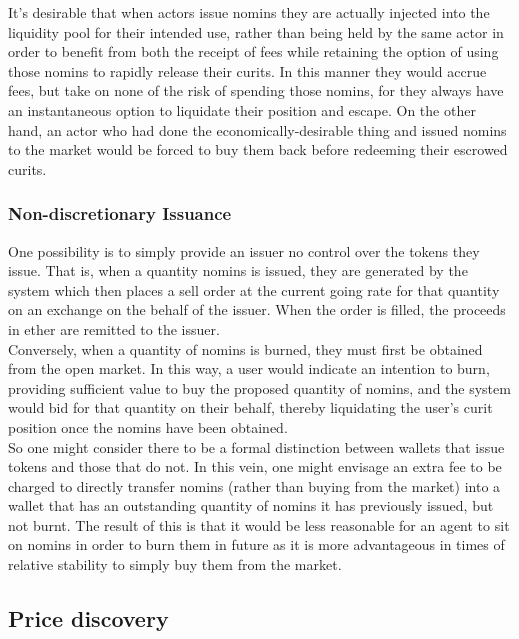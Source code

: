 \noindent It's desirable that when actors issue nomins they are actually injected into the liquidity pool for their intended use,
rather than being held by the same actor in order to benefit from both the receipt of fees while retaining the option of using those nomins to rapidly release their curits.
In this manner they would accrue fees, but take on none of the risk of spending those nomins, for they always have an instantaneous option to liquidate their position and escape.
On the other hand, an actor who had done the economically-desirable thing and issued nomins to the market would be forced to buy them back before redeeming their escrowed curits.

\subsubsection{Non-discretionary Issuance}

One possibility is to simply provide an issuer no control over the tokens they issue. That is, when a quantity nomins is issued, they are generated by the system which then places a sell order at the current going rate for that quantity on an exchange on the behalf of the issuer. When the order is filled, the proceeds in ether are remitted to the issuer. \\

\noindent Conversely, when a quantity of nomins is burned, they must first be obtained from the open market. In this way, a user would indicate an intention to burn, providing sufficient value to buy the proposed quantity of nomins, and the system would bid for that quantity on their behalf, thereby liquidating the user's curit position once the nomins have been obtained. \\

\noindent So one might consider there to be a formal distinction between wallets that issue tokens and those that do not. In this vein, one might envisage an extra fee to be charged to directly transfer nomins (rather than buying from the market) into a wallet that has an outstanding quantity of nomins it has previously issued, but not burnt. The result of this is that it would be less reasonable for an agent to sit on nomins in order to burn them in future as it is more advantageous in times of relative stability to simply buy them from the market. \\

\pagebreak 

\subsection{Price discovery}


